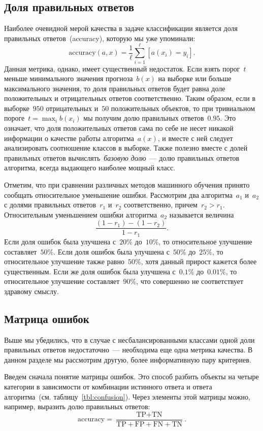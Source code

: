 \documentclass[12pt,fleqn]{article}
\begin{document}
\subsection{Доля правильных ответов}
Наиболее очевидной мерой качества в задаче классификации является доля правильных ответов~(accuracy),
которую мы уже упоминали:
\[
    \text{accuracy}(a, x)
    =
    \frac{1}{\ell}
    \sum_{i = 1}^{\ell} [a(x_i) = y_i].
\]
Данная метрика, однако, имеет существенный недостаток.
Если взять порог~$t$ меньше минимального значения прогноза~$b(x)$ на выборке
или больше максимального значения, то доля правильных ответов будет равна
доле положительных и отрицательных ответов соответственно.
Таким образом, если в выборке~$950$ отрицательных
и~$50$ положительных объектов, то при тривиальном пороге~$t = \max_i b(x_i)$
мы получим долю правильных ответов~$0.95$.
Это означает, что доля положительных ответов сама по себе
не несет никакой информации о качестве работы алгоритма~$a(x)$,
и вместе с ней следует анализировать соотношение классов в выборке.
Также полезно вместе с долей правильных ответов вычислять~\emph{базовую долю}~---
долю правильных ответов алгоритма, всегда выдающего наиболее мощный класс.

Отметим, что при сравнении различных методов машинного обучения
принято сообщать относительное уменьшение ошибки.
Рассмотрим два алгоритма~$a_1$ и~$a_2$ с долями правильных ответов~$r_1$ и~$r_2$
соответственно, причем~$r_2 > r_1$.
Относительным уменьшением ошибки алгоритма~$a_2$ называется величина
\[
    \frac{
        (1 - r_1) - (1 - r_2)
    }{
        1 - r_1
    }.
\]
Если доля ошибок была улучшена с~$20\%$ до~$10\%$,
то относительное улучшение составляет~$50\%$.
Если доля ошибок была улучшена с~$50\%$ до~$25\%$,
то относительное улучшение также равно~$50\%$,
хотя данный прирост кажется более существенным.
Если же доля ошибок была улучшена с~$0.1\%$ до~$0.01\%$,
то относительное улучшение составляет~$90\%$,
что совершенно не соответствует здравому смыслу.

\subsection{Матрица ошибок}
Выше мы убедились, что в случае с несбалансированными классами
одной доли правильных ответов недостаточно~--- необходима еще
одна метрика качества.
В данном разделе мы рассмотрим другую, более информативную пару критериев.

Введем сначала понятие матрицы ошибок.
Это способ разбить объекты на четыре категории в зависимости
от комбинации истинного ответа и ответа алгоритма~(см. таблицу~\ref{tbl:confusion}).
Через элементы этой матрицы можно, например, выразить долю правильных ответов:
\[
    \text{accuracy}
    =
    \frac{\text{TP} + \text{TN}}{\text{TP} + \text{FP} + \text{FN} + \text{TN}}.
\]
\end{document}
